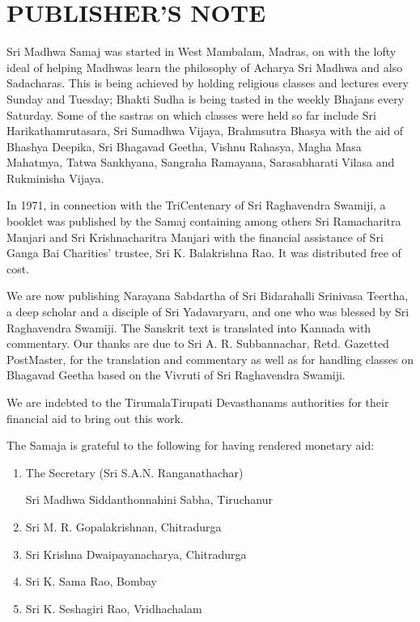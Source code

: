 
\chapter*{PUBLISHER'S NOTE}

\vskip -7pt

Sri Madhwa Samaj was started in West Mambalam, Madras, on  with the lofty ideal of helping Madhwas learn the philosophy of Acharya Sri Madhwa and also Sadacharas. This is being achieved by holding religious classes and lectures every Sunday and Tuesday; Bhakti Sudha is being tasted in the weekly Bhajans every Saturday. Some of the sastras on which classes were held so far include Sri Harikathamrutasara, Sri Sumadhwa Vijaya, Brahmsutra Bhasya with the aid of Bhashya Deepika, Sri Bhagavad Geetha, Vishnu Rahasya, Magha Masa Mahatmya, Tatwa Sankhyana, Sangraha Ramayana, Sarasabharati Vilasa and Rukminisha Vijaya.

\vskip -1pt

In 1971, in connection with the Tri\enginline{-}Centenary of Sri Raghavendra Swamiji, a booklet was published by the Samaj containing among others Sri Ramacharitra Manjari and Sri Krishnacharitra Manjari with the financial assistance of Sri Ganga Bai Charities' trustee, Sri K. Balakrishna Rao. It was distributed free of cost.

\vskip -1pt

We are now publishing Narayana Sabdartha of Sri Bidarahalli Srinivasa Teertha, a deep scholar and a disciple of Sri Yadavaryaru, and one who was blessed by Sri Raghavendra Swamiji. The Sanskrit text is translated into Kannada with commentary. Our thanks are due to Sri A. R. Subbannachar, Retd. Gazetted Post\enginline{-}Master, for the translation and commentary as well as for handling classes on Bhagavad Geetha based on the Vivruti of Sri Raghavendra Swamiji.

We are indebted to the Tirumala\enginline{-}Tirupati Devasthanams authorities for their financial aid to bring out this work.

The Samaja is grateful to the following for having rendered monetary aid:

\begin{enumerate}
\item 
 The Secretary (Sri S.A.N. Ranganathachar)

 Sri Madhwa Siddanthonnahini Sabha, Tiruchanur

 \item Sri M. R. Gopalakrishnan, Chitradurga

 \item Sri Krishna Dwaipayanacharya, Chitradurga

 \item Sri K. Sama Rao, Bombay

 \item Sri K. Seshagiri Rao, Vridhachalam

\end{enumerate}

